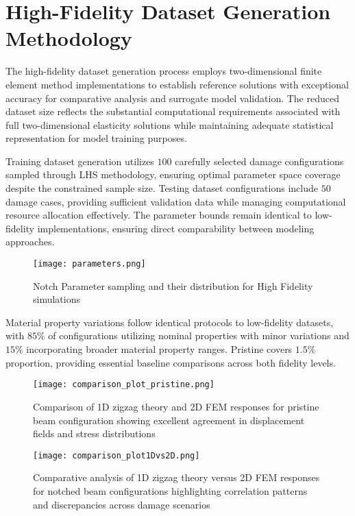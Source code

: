 \documentclass[12pt,a4paper]{report}
\begin{document}
\section{High-Fidelity Dataset Generation Methodology}

The high-fidelity dataset generation process employs two-dimensional finite element method implementations to establish reference solutions with exceptional accuracy for comparative analysis and surrogate model validation. The reduced dataset size reflects the substantial computational requirements associated with full two-dimensional elasticity solutions while maintaining adequate statistical representation for model training purposes.

Training dataset generation utilizes $100$ carefully selected damage configurations sampled through LHS methodology, ensuring optimal parameter space coverage despite the constrained sample size. Testing dataset configurations include $50$  damage cases, providing sufficient validation data while managing computational resource allocation effectively. The parameter bounds remain identical to low-fidelity implementations, ensuring direct comparability between modeling approaches.

\begin{figure}[htbp]
\centering
\texttt{[image: parameters.png]}
\caption{Notch Parameter sampling and their distribution for High Fidelity simulations}
\label{fig:parameters}
\end{figure}

Material property variations follow identical protocols to low-fidelity datasets, with $85\%$ of configurations utilizing nominal properties with minor variations and $15\%$ incorporating broader material property ranges. Pristine covers $1.5\%$ proportion, providing essential baseline comparisons across both fidelity levels.


\begin{figure}[htbp]
\centering
\texttt{[image: comparison\_plot\_pristine.png]}
\caption{Comparison of 1D zigzag theory and 2D FEM responses for pristine beam configuration showing excellent agreement in displacement fields and stress distributions}
\label{fig:pristine_comparison}
\end{figure}

\begin{figure}[htbp]
\centering
\texttt{[image: comparison\_plot1Dvs2D.png]}
\caption{Comparative analysis of 1D zigzag theory versus 2D FEM responses for notched beam configurations highlighting correlation patterns and discrepancies across damage scenarios}
\label{fig:damage_comparison}
\end{figure}
\end{document}
